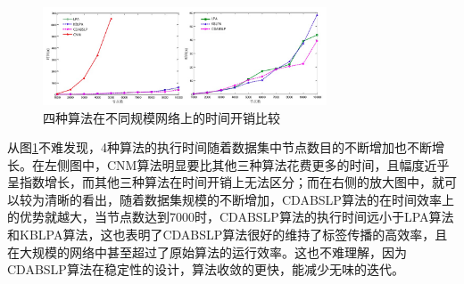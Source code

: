 \begin{figure}
  \centering
  \includegraphics[width=0.75\textwidth]{figures/butongguimowangluobijiao}
  \caption{四种算法在不同规模网络上的时间开销比较}\label{fig:butongguimowangluobijiao}
\end{figure}

从图\ref{fig:butongguimowangluobijiao}不难发现，4种算法的执行时间随着数据集中节点数目的不断增加也不断增长。在左侧图中，CNM算法明显要比其他三种算法花费更多的时间，且幅度近乎呈指数增长，而其他三种算法在时间开销上无法区分；而在右侧的放大图中，就可以较为清晰的看出，随着数据集规模的不断增加，CDABSLP算法的在时间效率上的优势就越大，当节点数达到7000时，CDABSLP算法的执行时间远小于LPA算法和KBLPA算法，这也表明了CDABSLP算法很好的维持了标签传播的高效率，且在大规模的网络中甚至超过了原始算法的运行效率。这也不难理解，因为CDABSLP算法在稳定性的设计，算法收敛的更快，能减少无味的迭代。





